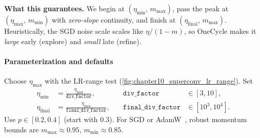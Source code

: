 \begin{enrichment}
	\noindent\textbf{What this guarantees.} We begin at $(\eta_{\text{min}},\,m_{\text{max}})$, pass the peak at $(\eta_{\text{max}},\,m_{\text{min}})$ with \emph{zero-slope} continuity, and finish at $(\eta_{\text{final}},\,m_{\text{max}})$. Heuristically, the SGD noise scale scales like $\eta/(1-m)$, so OneCycle makes it \emph{large} early (explore) and \emph{small} late (refine).
	
	\paragraph{Parameterization and defaults}
	Choose \(\eta_{\text{max}}\) with the LR-range test (\autoref{fig:chapter10_superconv_lr_range}). Set
	\[
	\begin{aligned}
		\eta_{\text{min}}   &= \frac{\eta_{\text{max}}}{\texttt{div\_factor}},      &\quad \texttt{div\_factor}      &\in [3,10],\\
		\eta_{\text{final}} &= \frac{\eta_{\text{max}}}{\texttt{final\_div\_factor}},&\quad \texttt{final\_div\_factor}&\in [10^3,10^4].
	\end{aligned}
	\]
	Use \(p\in[0.2,0.4]\) (start with \(0.3\)). For SGD or AdamW~\cite{loshchilov2019_adamw}, robust momentum bounds are \(m_{\text{max}}\approx 0.95\), \(m_{\text{min}}\approx 0.85\).
	

\end{enrichment}
